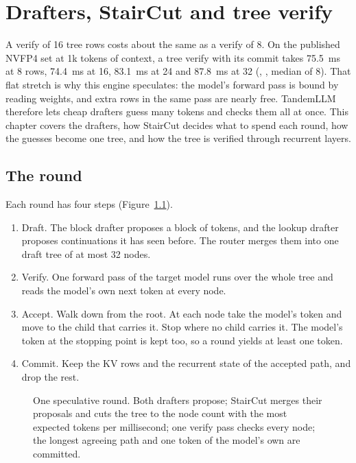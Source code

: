 \chapter{Drafters, StairCut and tree verify}\label{ch:speculation}

A verify of 16 tree rows costs about the same as a verify of 8. On the published NVFP4 set at 1k tokens of context, a tree verify with its commit takes 75.5~ms at 8 rows, 74.4~ms at 16, 83.1~ms at 24 and 87.8~ms at 32 (\measured, , median of 8). That flat stretch is why this engine speculates: the model's forward pass is bound by reading weights, and extra rows in the same pass are nearly free. TandemLLM therefore lets cheap drafters guess many tokens and checks them all at once. This chapter covers the drafters, how StairCut decides what to spend each round, how the guesses become one tree, and how the tree is verified through recurrent layers.

\section{The round}

Each round has four steps (Figure~\ref{fig:round}).

\begin{enumerate}
\item Draft. The block drafter proposes a block of tokens, and the lookup drafter proposes continuations it has seen before. The router merges them into one draft tree of at most 32 nodes.
\item Verify. One forward pass of the target model runs over the whole tree and reads the model's own next token at every node.
\item Accept. Walk down from the root. At each node take the model's token and move to the child that carries it. Stop where no child carries it. The model's token at the stopping point is kept too, so a round yields at least one token.
\item Commit. Keep the KV rows and the recurrent state of the accepted path, and drop the rest.
\end{enumerate}

\begin{figure}[htbp]
\centering

\caption[One speculative round]{One speculative round. Both drafters propose; StairCut merges their proposals and cuts the tree to the node count with the most expected tokens per millisecond; one verify pass checks every node; the longest agreeing path and one token of the model's own are committed.}\label{fig:round}
\end{figure}

